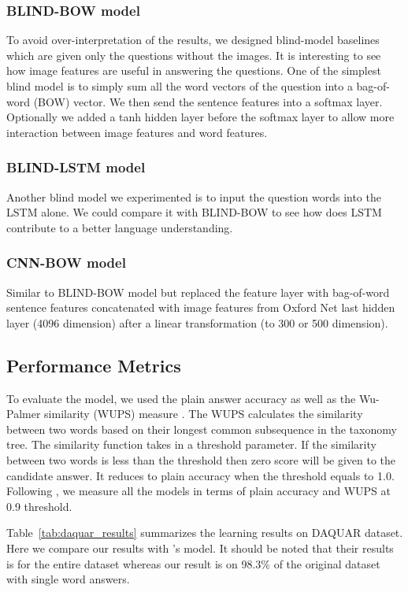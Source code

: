 \documentclass{article}
\renewcommand{\#}[1]{\textbf{#1}}
\begin{document}
\subsubsection{BLIND-BOW model}
To avoid over-interpretation of the results, we designed blind-model baselines which are given only the questions without the images. It is interesting to see how image features are useful in answering the questions. One of the simplest blind model is to simply sum all the word vectors of the question into a bag-of-word (BOW) vector. We then send the sentence features into a softmax layer. Optionally we added a tanh hidden layer before the softmax layer to allow more interaction between image features and word features.

\subsubsection{BLIND-LSTM model}
Another blind model we experimented is to input the question words into the LSTM alone. We could compare it with BLIND-BOW to see how does LSTM contribute to a better language understanding.

\subsubsection{CNN-BOW model}
Similar to BLIND-BOW model but replaced the feature layer with bag-of-word sentence features concatenated with image features from Oxford Net last hidden layer (4096 dimension) after a linear transformation (to 300 or 500 dimension).

\subsection{Performance Metrics}
To evaluate the model, we used the plain answer accuracy as well as the Wu-Palmer similarity (WUPS) measure \cite{wu94, malinowski14b}. The WUPS calculates the similarity between two words based on their longest common subsequence in the taxonomy tree. The similarity function takes in a threshold parameter. If the similarity between two words is less than the threshold then zero score will be given to the candidate answer. It reduces to plain accuracy when the threshold equals to 1.0. Following \cite{malinowski14b}, we measure all the models in terms of plain accuracy and WUPS at 0.9 threshold.

Table~\ref{tab:daquar_results} summarizes the learning results on DAQUAR dataset. Here we compare our results with \cite{malinowski14b}'s model. It should be noted that their results is for the entire dataset whereas our result is on 98.3\% of the original dataset with single word answers.
\end{document}
